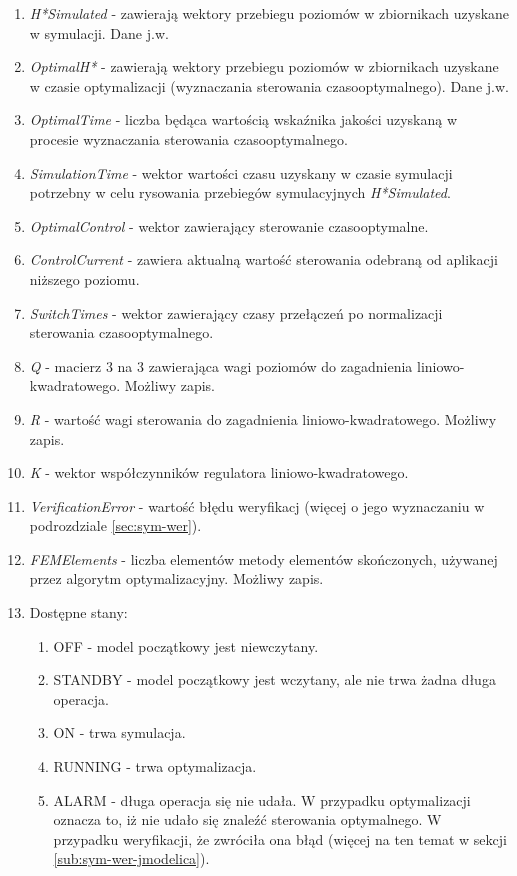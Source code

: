 \begin{enumerate}
\begin{enumerate}
        \item \emph{H*Simulated} - zawierają wektory przebiegu poziomów w zbiornikach uzyskane w symulacji. Dane j.w.
        \item \emph{OptimalH*} - zawierają wektory przebiegu poziomów w zbiornikach uzyskane w czasie optymalizacji (wyznaczania sterowania czasooptymalnego). Dane j.w.
        \item \emph{OptimalTime} - liczba będąca wartością wskaźnika jakości uzyskaną w procesie wyznaczania sterowania czasooptymalnego.
        \item \emph{SimulationTime} - wektor wartości czasu uzyskany w czasie symulacji potrzebny w celu rysowania przebiegów symulacyjnych \emph{H*Simulated}.
        \item \emph{OptimalControl} - wektor zawierający sterowanie czasooptymalne.
        \item \emph{ControlCurrent} - zawiera aktualną wartość sterowania odebraną od aplikacji niższego poziomu.
        \item \emph{SwitchTimes} - wektor zawierający czasy przełączeń po normalizacji sterowania czasooptymalnego.
        \item \emph{Q} - macierz 3 na 3 zawierająca wagi poziomów do zagadnienia liniowo-kwadratowego. Możliwy zapis.
        \item \emph{R} - wartość wagi sterowania do zagadnienia liniowo-kwadratowego. Możliwy zapis.
        \item \emph{K} - wektor współczynników regulatora liniowo-kwadratowego.
        \item \emph{VerificationError} - wartość błędu weryfikacj (więcej o jego wyznaczaniu w podrozdziale \ref{sec:sym-wer}).
        \item \emph{FEMElements} - liczba elementów metody elementów skończonych, używanej przez algorytm optymalizacyjny. Możliwy zapis.
        \item Dostępne stany:
        \begin{enumerate}
            \item OFF - model początkowy jest niewczytany.
            \item STANDBY - model początkowy jest wczytany, ale nie trwa żadna długa operacja.
            \item ON - trwa symulacja.
            \item RUNNING - trwa optymalizacja.
            \item ALARM - długa operacja się nie udała. W przypadku optymalizacji oznacza to, iż nie udało się znaleźć sterowania optymalnego. W przypadku weryfikacji, że zwróciła ona błąd (więcej na ten temat w sekcji \ref{sub:sym-wer-jmodelica}).

\end{enumerate}
\end{enumerate}
\end{enumerate}
